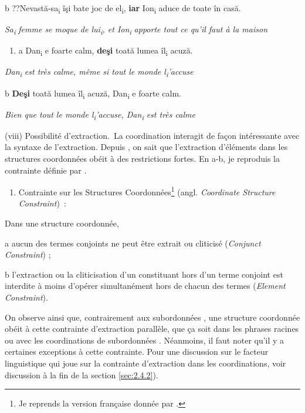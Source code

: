   b  ??Nevastă-sa\textsubscript{i} îşi bate joc de el\textsubscript{i}, \textbf{iar} Ion\textsubscript{i} aduce de toate în casă.

\textit{Sa}\textit{\textsubscript{i}}\textit{ femme se moque de lui}\textit{\textsubscript{i}}\textit{, et Ion}\textit{\textsubscript{i}}\textit{ apporte tout ce qu'il faut à la maison}


\begin{enumerate}
\item \label{bkm:Ref271663349}a  Dan\textsubscript{i} e foarte calm, \textbf{deşi} toată lumea îl\textsubscript{i} acuză.


\end{enumerate}
\textit{Dan}\textit{\textsubscript{i}}\textit{ est très calme, même si tout le monde l}\textit{\textsubscript{i}}\textit{'accuse}

  b  \textbf{Deşi} toată lumea îl\textsubscript{i} acuză, Dan\textsubscript{i} e foarte calm.

\textit{Bien que tout le monde l}\textit{\textsubscript{i}}\textit{'accuse, Dan}\textit{\textsubscript{i}}\textit{ est très calme}

(viii) Possibilité d'extraction.~La coordination interagit de façon intéressante avec la syntaxe de l'extraction. Depuis \citet{Ross1967}, on sait que l'extraction d'éléments dans les structures coordonnées obéit à des restrictions fortes. En a-b, je reproduis la contrainte définie par \citet{Grosu1973}. 


\begin{enumerate}
\item \label{bkm:Ref272240177}\label{bkm:Ref300868828}Contrainte sur les Structures Coordonnées\footnote{Je reprends la version française donnée par \citet[34]{Mouret2007}.} (angl. \textit{Coordinate Structure Constraint})\textit{~}: 


\end{enumerate}
  Dans une structure coordonnée,

  a  aucun des termes conjoints ne peut être extrait ou cliticisé (\textit{Conjunct Constraint}) ;

  b  l'extraction ou la cliticisation d'un constituant hors d'un terme conjoint est interdite à moins d'opérer simultanément hors de chacun des termes (\textit{Element Constraint}).

On observe ainsi que, contrairement aux subordonnées , une structure coordonnée obéit à cette contrainte d'extraction parallèle, que ça soit dans les phrases racines  ou avec les coordinations de subordonnées . Néanmoins, il faut noter qu'il y a certaines exceptions à cette contrainte. Pour une discussion sur le facteur linguistique qui joue sur la contrainte d'extraction dans les coordinations, voir discussion à la fin de la section \ref{sec:2.4.2}). 


